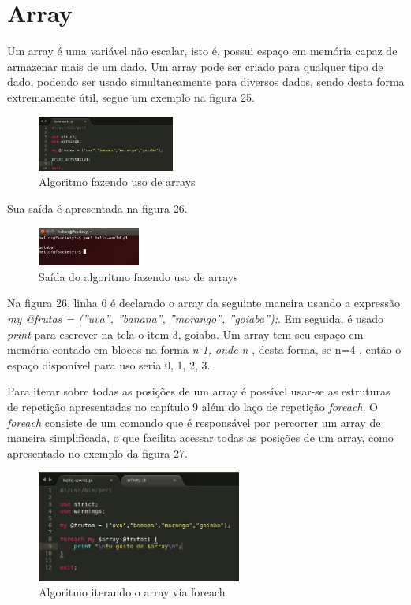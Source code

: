 \chapter{Array} 
Um array \'e uma vari\'avel n\~ao escalar, isto \'e, possui espa\c{c}o em mem\'oria capaz de armazenar mais de um dado. Um array pode ser criado
para qualquer tipo de dado, podendo ser usado simultaneamente para diversos dados, sendo desta forma extremamente \'util, segue um exemplo na figura 25.  

\begin{figure}[!htb]
	\centering
	\includegraphics[width=0.4\textwidth]{../5_figuras/image25}
	\caption{Algoritmo fazendo uso de arrays}
\end{figure}

Sua sa\'ida \'e apresentada na figura 26.

\begin{figure}[!htb]
	\centering
	\includegraphics[width=0.3\textwidth]{../5_figuras/image26}
	\caption{Sa\'ida do algoritmo fazendo uso de arrays}
\end{figure}

Na figura 26, linha 6 \'e declarado o array da seguinte maneira usando a express\~ao \textit{my @frutas = (''uva'', ''banana'', ''morango'', ''goiaba'');}. 
Em seguida, \'e usado \textit{print} para escrever na tela o item 3, goiaba. Um array tem seu espa\c{c}o em mem\'oria contado em blocos na forma 
\textit{n-1, onde n }, desta forma, se n=4 \Rightarrow, ent\~ao o espa\c{c}o dispon\'ivel para uso seria {0, 1, 2, 3}.

Para iterar sobre todas as posi\c{c}\~oes de um array \'e poss\'ivel usar-se as estruturas de repeti\c{c}\~ao apresentadas no cap\'itulo 9 al\'em do la\c{c}o
de repeti\c{c}\~ao \textit{foreach}. O \textit{foreach} consiste de um comando que \'e respons\'avel por percorrer um array de maneira simplificada, o que 
facilita acessar todas as posi\c{c}\~oes de um array, como apresentado no exemplo da figura 27.

\begin{figure}[!htb]
	\centering
	\includegraphics[width=0.6\textwidth]{../5_figuras/image27}
	\caption{Algoritmo iterando o array via foreach}
\end{figure}

